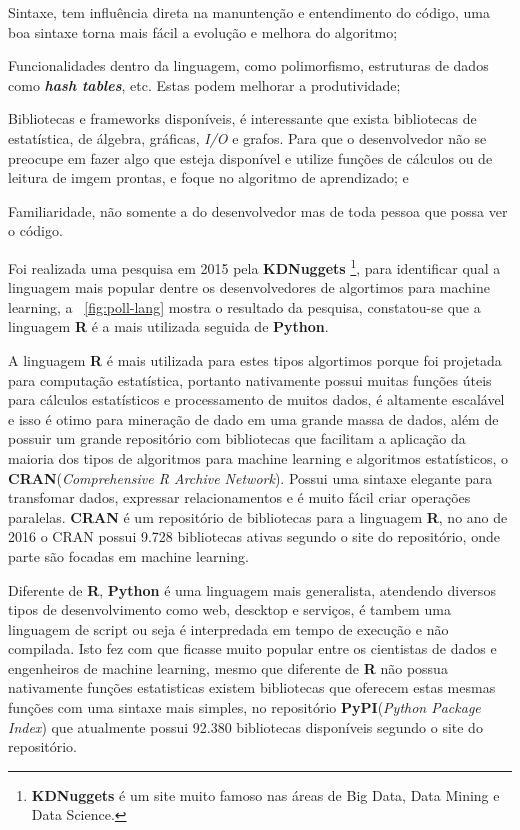 \begin{alineas}
    \item Sintaxe, tem influência direta na manuntenção e entendimento do código, uma boa sintaxe torna mais fácil a evolução e melhora do algoritmo;
    \item Funcionalidades dentro da linguagem, como polimorfismo, estruturas de dados como \textbf{\textit{hash tables}}, etc. 
		  Estas podem melhorar a produtividade; 
    \item Bibliotecas e frameworks disponíveis, é interessante que exista bibliotecas de estatística, de álgebra, gráficas, \textit{I/O} e grafos. Para que
          o desenvolvedor não se preocupe em fazer algo que esteja disponível e utilize funções de cálculos ou de leitura de imgem prontas, 
		  e foque no algoritmo de aprendizado; e
    \item Familiaridade, não somente a do desenvolvedor mas de toda pessoa que possa ver o código.     
\end{alineas}

Foi realizada uma pesquisa em 2015 pela \textbf{KDNuggets} \footnote{\textbf{KDNuggets} é um site muito famoso nas áreas de Big Data, Data Mining e Data Science.}, para identificar qual a linguagem mais popular dentre os desenvolvedores de algortimos para 
machine learning, a ~\autoref{fig:poll-lang} mostra o resultado da pesquisa, constatou-se que a linguagem \textbf{R} é a mais utilizada seguida de 
\textbf{Python}.   


A linguagem \textbf{R} é mais utilizada para estes tipos algortimos porque foi projetada para computação estatística, portanto 
nativamente possui muitas funções úteis para cálculos estatísticos e processamento de muitos dados, é 
altamente escalável e isso é otimo para mineração de dado em uma grande massa de dados, além de possuir um grande repositório com 
bibliotecas que facilitam a aplicação da maioria dos tipos de algoritmos para machine learning e algoritmos estatísticos, o 
\textbf{CRAN}(\textit{Comprehensive R Archive Network}). 
Possui uma sintaxe elegante para transfomar dados, expressar relacionamentos e é muito fácil criar operações paralelas.
\textbf{CRAN} é um repositório de bibliotecas para a linguagem \textbf{R}, no ano de 2016 o CRAN possui 9.728 bibliotecas ativas segundo o site do repositório, 
onde parte são focadas em machine learning.


Diferente de \textbf{R}, \textbf{Python} é uma linguagem mais generalista, atendendo diversos tipos de desenvolvimento como web, descktop e serviços, 
é tambem uma linguagem de script ou seja é interpredada em tempo de execução e não compilada. 
Isto fez com que ficasse muito popular entre os cientistas de dados e engenheiros de machine learning, mesmo que diferente de 
\textbf{R} não possua nativamente funções estatisticas existem bibliotecas que oferecem estas mesmas funções com uma sintaxe
 mais simples, no repositório \textbf{PyPI}(\textit{Python Package Index}) que atualmente possui 92.380 bibliotecas disponíveis segundo o site do repositório.      

